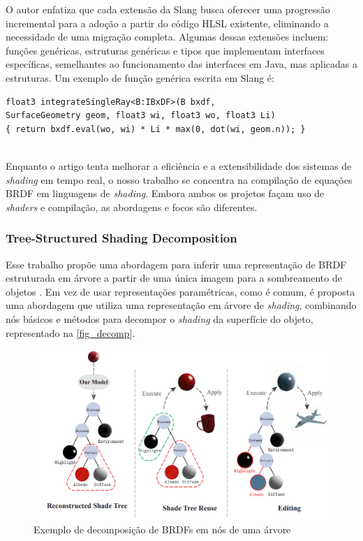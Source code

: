 \documentclass[english, 
               brazil, 
               bsc] %
               {dcomp-abntex2}
\begin{document}
O autor enfatiza que cada extensão da Slang busca oferecer uma progressão incremental para a adoção a partir do código HLSL existente, eliminando a necessidade de uma migração completa. Algumas dessas extensões incluem: funções genéricas, estruturas genéricas e tipos que implementam interfaces específicas, semelhantes ao funcionamento das interfaces em Java, mas aplicadas a estruturas. Um exemplo de função genérica escrita em Slang é:


\begin{verbatim}
float3 integrateSingleRay<B:IBxDF>(B bxdf,
SurfaceGeometry geom, float3 wi, float3 wo, float3 Li)
{ return bxdf.eval(wo, wi) * Li * max(0, dot(wi, geom.n)); }


\end{verbatim}




Enquanto o artigo tenta melhorar a eficiência e a extensibilidade dos sistemas de \textit{shading} em tempo real, o nosso trabalho se concentra na compilação de equações BRDF em linguagens de \textit{shading}. Embora ambos os projetos façam uso de \textit{shaders} e compilação, as abordagens e focos são diferentes.


\subsubsection{Tree-Structured Shading Decomposition}


Esse trabalho propõe uma abordagem para inferir uma representação de BRDF estruturada em árvore a partir de uma única imagem para a sombreamento de objetos \cite{tree_decomposition}. Em vez de usar representações paramétricas, como é comum, é proposta uma abordagem que utiliza uma representação em árvore de \textit{shading}, combinando nós básicos e métodos para decompor o \textit{shading} da superfície do objeto, representado na \autoref{fig_decomp}.


\begin{figure}[H]
        \caption{\label{fig_decomp} Exemplo de decomposição de BRDFs em nós de uma árvore}
        \begin{center}
            \includegraphics[scale=0.5]{./Imagens/tree-shading.png}
        \end{center}
\end{figure}
\end{document}
